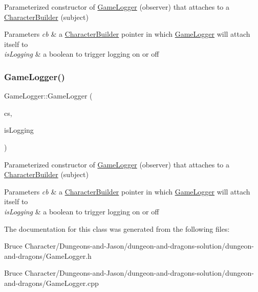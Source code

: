 Parameterized constructor of \hyperlink{class_game_logger}{Game\+Logger} (observer) that attaches to a \hyperlink{class_character_builder}{Character\+Builder} (subject) 
\begin{DoxyParams}{Parameters}
{\em cb} & a \hyperlink{class_character_builder}{Character\+Builder} pointer in which \hyperlink{class_game_logger}{Game\+Logger} will attach itself to \\
\hline
{\em is\+Logging} & a boolean to trigger logging on or off \\
\hline
\end{DoxyParams}
\hypertarget{class_game_logger_a0807589f947226185269a45df60e7121}{}\label{class_game_logger_a0807589f947226185269a45df60e7121} 
\subsubsection{\texorpdfstring{Game\+Logger()}{GameLogger()}\hspace{0.1cm}{\footnotesize\ttfamily [7/7]}}
{\footnotesize\ttfamily Game\+Logger\+::\+Game\+Logger (\begin{DoxyParamCaption}\item[{\hyperlink{class_character_strategy}{Character\+Strategy} $\ast$}]{cs,  }\item[{bool}]{is\+Logging }\end{DoxyParamCaption})}

Parameterized constructor of \hyperlink{class_game_logger}{Game\+Logger} (observer) that attaches to a \hyperlink{class_character_builder}{Character\+Builder} (subject) 
\begin{DoxyParams}{Parameters}
{\em cb} & a \hyperlink{class_character_builder}{Character\+Builder} pointer in which \hyperlink{class_game_logger}{Game\+Logger} will attach itself to \\
\hline
{\em is\+Logging} & a boolean to trigger logging on or off \\
\hline
\end{DoxyParams}


The documentation for this class was generated from the following files\+:\begin{DoxyCompactItemize}
\item 
Bruce Character/\+Dungeons-\/and-\/\+Jason/dungeon-\/and-\/dragons-\/solution/dungeon-\/and-\/dragons/Game\+Logger.\+h\item 
Bruce Character/\+Dungeons-\/and-\/\+Jason/dungeon-\/and-\/dragons-\/solution/dungeon-\/and-\/dragons/Game\+Logger.\+cpp\end{DoxyCompactItemize}
